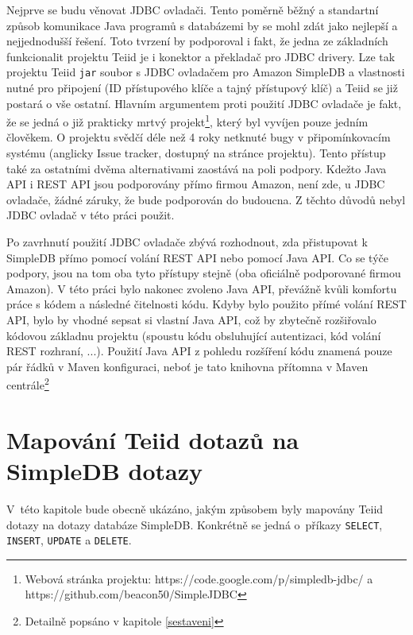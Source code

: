 \documentclass[oneside,12pt]{fithesis2}
\begin{document}
Nejprve se budu věnovat JDBC ovladači. Tento poměrně běžný a standartní způsob komunikace Java programů s databázemi by se mohl zdát jako nejlepší a nejjednodušší řešení. Toto tvrzení by podporoval i fakt, že jedna ze základních funkcionalit projektu Teiid je i konektor a překladač pro JDBC drivery. Lze tak  projektu Teiid \verb&jar& soubor s JDBC ovladačem pro Amazon SimpleDB a vlastnosti nutné pro připojení (ID přístupového klíče a tajný přístupový klíč) a Teiid se již postará o vše ostatní. Hlavním argumentem proti použití JDBC ovladače je fakt, že se jedná o již prakticky mrtvý projekt\footnote{Webová stránka projektu: https://code.google.com/p/simpledb-jdbc/ a https://github.com/beacon50/SimpleJDBC}, který byl vyvíjen pouze jedním člověkem. O  projektu svědčí déle než  4 roky netknuté bugy v připomínkovacím systému (anglicky Issue tracker, dostupný na stránce projektu). Tento přístup také za ostatními dvěma alternativami zaostává na poli podpory. Kdežto Java API i REST API jsou podporovány přímo firmou Amazon, není zde, u JDBC ovladače, žádné záruky, že bude podporován do budoucna. Z těchto důvodů nebyl JDBC ovladač v této práci použit.

Po zavrhnutí použití JDBC ovladače zbývá rozhodnout, zda přistupovat k SimpleDB přímo pomocí volání REST API nebo pomocí Java API. Co se týče podpory, jsou na tom oba tyto přístupy stejně (oba oficiálně podporované firmou Amazon). V této práci bylo nakonec zvoleno Java API, převážně kvůli komfortu práce s kódem a následné čitelnosti kódu. Kdyby bylo použito přímé volání REST API, bylo by vhodné sepsat si vlastní Java API, což by zbytečně rozšiřovalo kódovou základnu projektu (spoustu kódu obsluhující autentizaci, kód  volání REST rozhraní, ...). Použití Java API z pohledu rozšíření kódu znamená pouze pár řádků v Maven konfiguraci, neboť je tato knihovna přítomna v Maven centrále\footnote{Detailně popsáno v kapitole \ref{sestaveni}}

\chapter{Mapování Teiid dotazů na SimpleDB dotazy}
V~této kapitole bude obecně ukázáno, jakým způsobem byly mapovány Teiid dotazy na dotazy databáze SimpleDB. Konkrétně se jedná o~příkazy \verb<SELECT<, \verb<INSERT<, \verb<UPDATE< a \verb<DELETE<.
\end{document}
